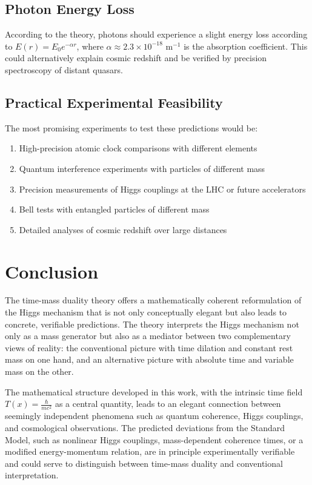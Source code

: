 \documentclass[a4paper,12pt]{article}
\newcommand{\Tfield}{T(x)} %
\begin{document}
	\subsection{Photon Energy Loss}
	
	According to the theory, photons should experience a slight energy loss according to $E(r) = E_0 e^{-\alpha r}$, where $\alpha \approx 2.3 \times 10^{-18} \text{ m}^{-1}$ is the absorption coefficient. This could alternatively explain cosmic redshift and be verified by precision spectroscopy of distant quasars.
	
	\subsection{Practical Experimental Feasibility}
	
	The most promising experiments to test these predictions would be:
	\begin{enumerate}
		\item High-precision atomic clock comparisons with different elements
		\item Quantum interference experiments with particles of different mass
		\item Precision measurements of Higgs couplings at the LHC or future accelerators
		\item Bell tests with entangled particles of different mass
		\item Detailed analyses of cosmic redshift over large distances
	\end{enumerate}
	
	\section{Conclusion}
	
	The time-mass duality theory offers a mathematically coherent reformulation of the Higgs mechanism that is not only conceptually elegant but also leads to concrete, verifiable predictions. The theory interprets the Higgs mechanism not only as a mass generator but also as a mediator between two complementary views of reality: the conventional picture with time dilation and constant rest mass on one hand, and an alternative picture with absolute time and variable mass on the other.
	
	The mathematical structure developed in this work, with the intrinsic time field $\Tfield = \frac{\hbar}{mc^2}$ as a central quantity, leads to an elegant connection between seemingly independent phenomena such as quantum coherence, Higgs couplings, and cosmological observations. The predicted deviations from the Standard Model, such as nonlinear Higgs couplings, mass-dependent coherence times, or a modified energy-momentum relation, are in principle experimentally verifiable and could serve to distinguish between time-mass duality and conventional interpretation.
	
\end{document}
